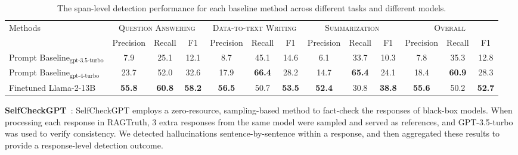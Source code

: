 \documentclass[11pt]{article}
\newcommand{\CorpusName}{RAGTruth}
\begin{document}
\begin{table}[!ht]
\scriptsize
\centering
    \begin{tabular}{l|ccccccccc|ccc}
    \toprule
    \multirow{2}{*}{Methods} & \multicolumn{3}{c}{\textsc{Question Answering}} & \multicolumn{3}{c}{\textsc{Data-to-text Writing}} & \multicolumn{3}{c}{\textsc{Summarization}} & \multicolumn{3}{c}{\textsc{Overall}}\\
     \cmidrule(lr){2-4} \cmidrule(lr){5-7} \cmidrule(lr){8-10}  \cmidrule(lr){11-13}
     & Precision & Recall & F1  & Precision & Recall & F1  & Precision & Recall & F1 & Precision & Recall & F1 \\
     \midrule
     Prompt Baseline$_\textrm{gpt-3.5-turbo}$ & 7.9 & 25.1 & 12.1 & 8.7 & 45.1 & 14.6 & 6.1 & 33.7  & 10.3 & 7.8 & 35.3 & 12.8 \\
     Prompt Baseline$_\textrm{gpt-4-turbo}$& 23.7& 52.0 & 32.6  & 17.9 & \textbf{66.4} & 28.2 & 14.7 & \textbf{65.4} & 24.1 & 18.4 & \textbf{60.9} & 28.3\\
     Finetuned Llama-2-13B & \textbf{55.8} & \textbf{60.8} & \textbf{58.2} & \textbf{56.5} & 50.7 & \textbf{53.5} & \textbf{52.4} & 30.8 & \textbf{38.8} & \textbf{55.6} & 50.2 & \textbf{52.7}\\
    \bottomrule
    \end{tabular}
    \caption{The span-level detection performance for each baseline method across different tasks and different models. 
    }
    \label{tab:2-span-result}
\end{table}



\noindent \textbf{SelfCheckGPT}~\citep{Manakul2023-selfcheckgpt}: SelfCheckGPT employs a zero-resource, sampling-based method to fact-check the responses of black-box models. When processing each response in {\CorpusName}, 3 extra responses from the same model were sampled and served as references, and GPT-3.5-turbo was used to verify consistency. We detected hallucinations sentence-by-sentence within a response, and then aggregated these results to provide a response-level detection outcome.
\end{document}
